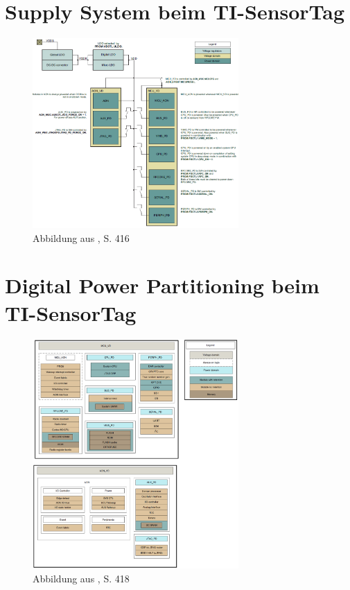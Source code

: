 \chapter{Supply System beim TI-SensorTag}
\label{anhang_sensortag_supply} 


\begin{figure}[h]
    \includegraphics [width=0.7\textwidth]{7Anhang/imag/powerdomain_1.png} 
    \caption{Abbildung aus \cite{Sensortag_Manual}, S. 416}
    \label{a_supply}
\end{figure}

\chapter{Digital Power Partitioning beim TI-SensorTag}\label{anhang_sensortag_PowerDomain} 


\begin{figure}[h]
    \includegraphics [width=0.7\textwidth]{7Anhang/imag/powerdomain_2.png} 
     \caption{Abbildung aus \cite{Sensortag_Manual}, S. 418}
     \label{a_powerdomain}
\end{figure}

